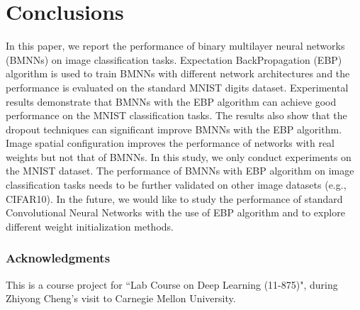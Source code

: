 \documentclass{article} %
\begin{document}
\section{Conclusions}
In this paper, we report the performance of binary multilayer neural networks (BMNNs) on image classification tasks. Expectation BackPropagation (EBP) algorithm is used to train BMNNs with different network architectures and the performance is evaluated on the standard MNIST digits dataset. Experimental results demonstrate that BMNNs with the EBP algorithm can achieve good performance on the MNIST classification tasks. The results also show that the dropout techniques can significant improve BMNNs with the EBP algorithm. Image spatial configuration improves the performance of networks with real weights but not that of BMNNs. In this study, we only conduct experiments on the MNIST dataset. The performance of BMNNs with EBP algorithm on image classification tasks needs to be further validated on other image datasets (e.g., CIFAR10). In the future, we would like to study the performance of standard Convolutional Neural Networks with the use of EBP algorithm and to explore different weight initialization methods.

\subsubsection*{Acknowledgments}
 This is a course project for ``Lab Course on Deep Learning (11-875)", during Zhiyong Cheng's visit to Carnegie Mellon University.
\end{document}
